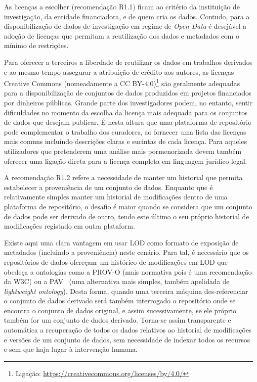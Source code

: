 \documentclass[sigconf,nonacm]{acmart}
\begin{document}
As licenças a escolher (recomendação R1.1) ficam ao critério da instituição de investigação, da entidade financiadora, e de quem cria os dados. Contudo, para a disponibilização de dados de investigação em regime de \emph{Open Data} é desejável a adoção de licenças que permitam a reutilização dos dados e metadados com o mínimo de restrições.

Para oferecer a terceiros a liberdade de reutilizar os dados em trabalhos derivados e ao mesmo tempo assegurar a atribuição de crédito aos autores, as licenças Creative Commons (nomeadamente a CC BY-4.0)\footnote{Ligação: \url{https://creativecommons.org/licenses/by/4.0/}} são geralmente adequadas para a disponibilização de conjuntos de dados produzidos em projetos financiados por dinheiros públicas.
%
Grande parte dos investigadores podem, no entanto, sentir dificuldades no momento da escolha da licença mais adequada para os conjuntos de dados que desejam publicar. É nesta altura que uma plataforma de repositório pode complementar o trabalho dos curadores, ao fornecer uma lista das licenças mais comuns incluindo descrições claras e sucintas de cada licença. Para aqueles utilizadores que pretenderem uma análise mais pormenorizada devem também oferecer uma ligação direta para a licença completa em linguagem jurídico-legal.

A recomendação R1.2 refere a necessidade de manter um historial que permita estabelecer a proveniência de um conjunto de dados. Enquanto que é relativamente simples manter um historial de modificações dentro de uma plataforma de repositório, o desafio é maior quando se considera que um conjunto de dados pode ser derivado de outro, tendo este último o seu próprio historial de modificações registado em outra plataform.

Existe aqui uma clara vantagem em usar \gls{LOD} como formato de exposição de metadados (incluindo a proveniência) neste cenário. Para tal, é necessário que os repositórios de dados ofereçam um histórico de modificações em \gls{LOD} que obedeça a ontologias como a PROV-O\cite{lebo2013prov} (mais normativa pois é uma recomendação da \gls{W3C}) ou a \gls{PAV}~\cite{ciccarese2013pav} (uma alternativa mais simples, também apelidada de \emph{lightweight ontology}). Desta forma, quando uma terceira máquina des-referenciar o conjunto de dados derivado será também interrogado o repositório onde se encontra o conjunto de dados original, e assim sucessivamente, se ele próprio também for um conjunto de dados derivado. Torna-se assim transparente e automática a recuperação de todos os dados relativos ao historial de modificações e versões de um conjunto de dados, sem necessidade de indexar todos os recursos e sem que haja lugar à intervenção humana.
\end{document}
